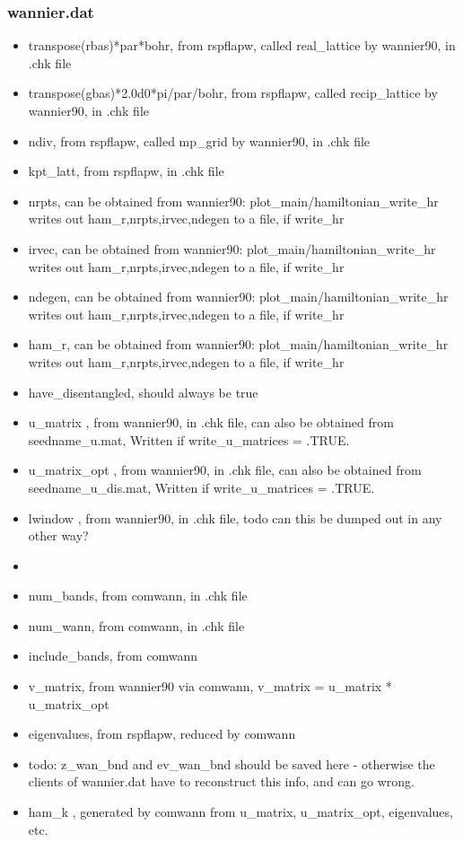 \documentclass[aps,prb,singlecolumn,preprintnumbers,amsmath,amssymb]{revtex4}
\begin{document}
\subsubsection{wannier.dat}
\begin{itemize}
\item transpose(rbas)*par*bohr, from rspflapw, called real\_lattice by wannier90, in .chk file
\item transpose(gbas)*2.0d0*pi/par/bohr, from rspflapw, called recip\_lattice by wannier90, in .chk file
\item ndiv, from rspflapw, called mp\_grid by wannier90, in .chk file
\item kpt\_latt, from rspflapw, in .chk file
\item nrpts, can be obtained from wannier90: plot\_main/hamiltonian\_write\_hr writes out ham\_r,nrpts,irvec,ndegen to a file, if write\_hr
\item irvec, can be obtained from wannier90: plot\_main/hamiltonian\_write\_hr writes out ham\_r,nrpts,irvec,ndegen to a file, if write\_hr
\item ndegen, can be obtained from wannier90: plot\_main/hamiltonian\_write\_hr writes out ham\_r,nrpts,irvec,ndegen to a file, if write\_hr
\item ham\_r, can be obtained from wannier90: plot\_main/hamiltonian\_write\_hr writes out ham\_r,nrpts,irvec,ndegen to a file, if write\_hr
\item have\_disentangled, should always be true
\item u\_matrix , from wannier90, in .chk file, can also be obtained from seedname\_u.mat, Written if write\_u\_matrices = .TRUE.
\item  u\_matrix\_opt , from wannier90, in .chk file, can also be obtained from seedname\_u\_dis.mat, Written if write\_u\_matrices = .TRUE.
\item  lwindow , from wannier90, in .chk file, todo can this be dumped out in any other way?
\item
\item num\_bands, from comwann, in .chk file
\item num\_wann,    from comwann, in .chk file
\item include\_bands, from comwann      
\item  v\_matrix, from wannier90 via comwann,  v\_matrix = u\_matrix * u\_matrix\_opt 
 \item eigenvalues, from rspflapw, reduced by comwann
 \item todo: z\_wan\_bnd and ev\_wan\_bnd should be saved here - otherwise the clients of wannier.dat have to reconstruct this info, and can go wrong.  
\item ham\_k , generated by comwann from u\_matrix, u\_matrix\_opt, eigenvalues, etc.
\end{itemize}
\end{document}
